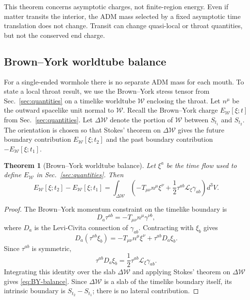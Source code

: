 \documentclass[aps,prd,10pt,onecolumn,nofootinbib,superscriptaddress,floatfix]{revtex4-2}
\newtheorem{theorem}{Theorem}
\begin{document}
This theorem concerns asymptotic charges, not finite-region energy.  Even if
matter transits the interior, the ADM mass selected by a fixed asymptotic time
translation does not change.  Transit can change quasi-local or throat
quantities, but not the conserved end charge.

\subsection{Brown--York worldtube balance}

For a single-ended wormhole there is no separate ADM mass for each mouth.  To
state a local throat result, we use the Brown--York stress tensor from
Sec.~\ref{sec:quantities} on a timelike worldtube $\mathcal W$ enclosing the
throat.  Let $n^\mu$ be the outward spacelike unit normal to $\mathcal W$.
Recall the Brown--York charge $E_{\mathcal W}[\xi;t]$ from
Sec.~\ref{sec:quantities}.  Let $\Delta\mathcal W$ denote the portion of
$\mathcal W$ between $S_{t_1}$ and $S_{t_2}$.  The orientation is chosen so
that Stokes' theorem on $\Delta\mathcal W$ gives the future boundary
contribution $E_{\mathcal W}[\xi;t_2]$ and the past boundary contribution
$-E_{\mathcal W}[\xi;t_1]$.

\begin{theorem}[Brown--York worldtube balance]
\label{thm:BY-balance}
Let $\xi^a$ be the time flow used to define $E_{\mathcal W}$ in
Sec.~\ref{sec:quantities}.  Then
\begin{equation}
\label{eq:BY-balance}
  E_{\mathcal W}[\xi;t_2]-E_{\mathcal W}[\xi;t_1]
  =
  \int_{\Delta\mathcal W}
  \left(
    -T_{\mu\nu}n^\mu\xi^\nu
    +\frac12\tau^{ab}\mathcal L_\xi\gamma_{ab}
  \right)d^3V .
\end{equation}
\end{theorem}

\begin{proof}
The Brown--York momentum constraint on the timelike boundary is
\cite{BrownYork1993Quasilocal,EppMcGrathMann2013Momentum}
\begin{equation}
  D_a\tau^{ab}=-T_{\mu\nu}n^\mu\gamma^{\nu b},
\end{equation}
where $D_a$ is the Levi-Civita connection of $\gamma_{ab}$.  Contracting with
$\xi_b$ gives
\begin{equation}
  D_a(\tau^{ab}\xi_b)
  =
  -T_{\mu\nu}n^\mu\xi^\nu+\tau^{ab}D_a\xi_b.
\end{equation}
Since $\tau^{ab}$ is symmetric,
\begin{equation}
  \tau^{ab}D_a\xi_b=\frac12\tau^{ab}\mathcal L_\xi\gamma_{ab}.
\end{equation}
Integrating this identity over the slab $\Delta\mathcal W$ and applying
Stokes' theorem on $\Delta\mathcal W$ gives \eqref{eq:BY-balance}.  Since
$\Delta\mathcal W$ is a slab of the timelike boundary itself, its intrinsic
boundary is $S_{t_2}-S_{t_1}$; there is no lateral contribution.
\end{proof}
\end{document}
